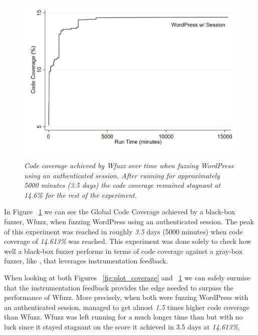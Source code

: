 \begin{figure}[!htb]
  \centering \includegraphics[width=\linewidth]{figures/plot_coverage2.pdf}
  \captionsetup{justification=centering} 
  \caption[Accumulated global code coverage using Wfuzz]{\textit{Code coverage achieved by Wfuzz over time when fuzzing WordPress using an authenticated session. After running for approximately 5000 minutes (3.5 days) the code coverage remained stagnant at 14.6\% for the rest of the experiment.}}
  \label{fig:plot_coverage2}
\end{figure}

In Figure ~\ref{fig:plot_coverage2} we can see the Global Code Coverage achieved by a black-box fuzzer, Wfuzz, when fuzzing WordPress using an authenticated session. The peak of this experiment was reached in roughly \emph{3.5} days (5000 minutes) when code coverage of \emph{14.613\%} was reached. This experiment was done solely to check how well a black-box fuzzer performs in terms of code coverage against a gray-box fuzzer, like \pname{}, that leverages instrumentation feedback. 

When looking at both Figures ~\ref{fig:plot_coverage} and ~\ref{fig:plot_coverage2} we can safely surmise that the instrumentation feedback provides \pname{} the edge needed to surpass the performance of Wfuzz. More precisely, when both were fuzzing WordPress with an authenticated session, \pname{} managed to get almost \emph{1.5} times higher code coverage than Wfuzz. Wfuzz was left running for a much longer time than \pname{} but with no luck since it stayed stagnant on the score it achieved in 3.5 days at \emph{14.613\%}.

